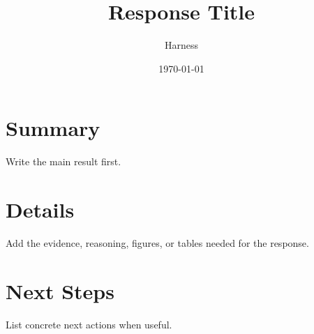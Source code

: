 \documentclass[11pt]{article}
\title{Response Title}
\author{Harness}
\date{\today}
\begin{document}
\maketitle

\section{Summary}

Write the main result first.

\section{Details}

Add the evidence, reasoning, figures, or tables needed for the response.

\section{Next Steps}

List concrete next actions when useful.
\end{document}
